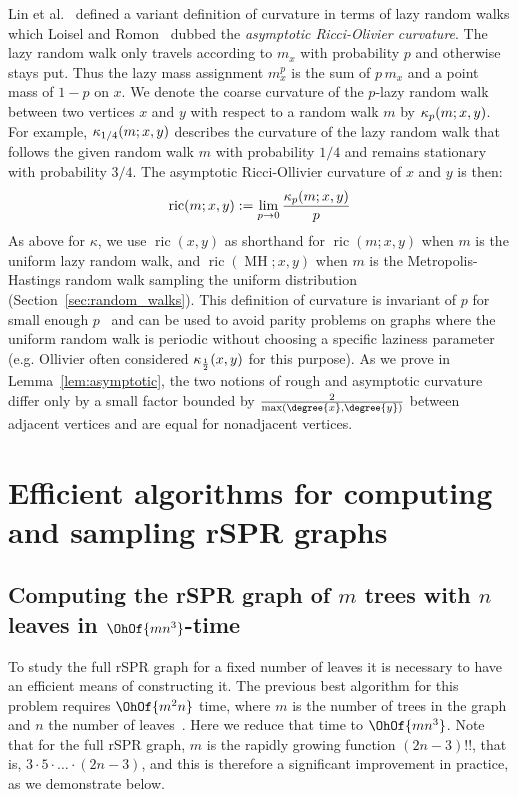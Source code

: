\documentclass[11pt,onecolumn,conference]{IEEEtran}
\newcommand{\MH}{\operatorname{MH}}
\newcommand{\curvature}[2][]{%
    \ifthenelse{\equal{#1}{}}%
		{\kappa(#2)}%
		{\kappa_{#1}(#2)}%
}
\newcommand{\ric}[1]{
	\operatorname{ric}(#1)%
}
\begin{document}
Lin et al.~\cite{lin2011ricci} defined a variant definition of curvature in terms of lazy random walks which Loisel and Romon~\cite{Loisel2014-hu} dubbed the \emph{asymptotic Ricci-Olivier curvature}.
The lazy random walk only travels according to $m_x$ with probability $p$ and otherwise stays put.
Thus the lazy mass assignment $m^p_x$ is the sum of $p\, m_x$ and a point mass of $1 - p$ on $x$.
We denote the coarse curvature of the $p$-lazy random walk between two vertices $x$ and $y$ with respect to a random walk $m$ by $\curvature[p]{m; x,y}$.
For example, $\curvature[1/4]{m; x,y}$ describes the curvature of the lazy random walk that follows the given random walk $m$ with probability $1/4$ and remains stationary with probability $3/4$.
The asymptotic Ricci-Ollivier curvature of $x$ and $y$ is then:
\begin{equation}
\ric{m; x, y} := \lim_{p \rightarrow 0} \frac{\curvature[p]{m; x,y}}{p}
\label{eq:asympCurvatureDef}
\end{equation}
As above for $\kappa$, we use $\ric{x, y}$ as shorthand for $\ric{m; x, y}$ when $m$ is the uniform lazy random walk, and $\ric{\MH; x, y}$ when $m$ is the Metropolis-Hastings random walk sampling the uniform distribution (Section~\ref{sec:random_walks}).
This definition of curvature is invariant of $p$ for small enough $p$~\cite{Loisel2014-hu} and can be used to avoid parity problems on graphs where the uniform random walk is periodic without choosing a specific laziness parameter (e.g. Ollivier often considered $\curvature[\frac{1}{2}]{x,y}$ for this purpose).
As we prove in Lemma~\ref{lem:asymptotic}, the two notions of rough and asymptotic curvature differ only by a small factor bounded by $\frac{2}{\max(\degree{x}, \degree{y})}$ between adjacent vertices and are equal for nonadjacent vertices.

\section{Efficient algorithms for computing and sampling rSPR graphs}

\subsection{Computing the rSPR graph of $m$ trees with $n$ leaves in $\OhOf{mn^3}$-time}
\label{sec:computing_treespace}

To study the full rSPR graph for a fixed number of leaves it is necessary to have an efficient means of constructing it.
The previous best algorithm for this problem requires $\OhOf{m^2 n}$ time, where $m$ is the number of trees in the graph and $n$ the number of leaves~\cite{Whidden2015-yi}.
Here we reduce that time to $\OhOf{mn^3}$.
Note that for the full rSPR graph, $m$ is the rapidly growing function $(2n-3)!!$, that is, $3 \cdot 5 \cdot \ldots \cdot (2n-3)$, and this is therefore a significant improvement in practice, as we demonstrate below.
\end{document}
